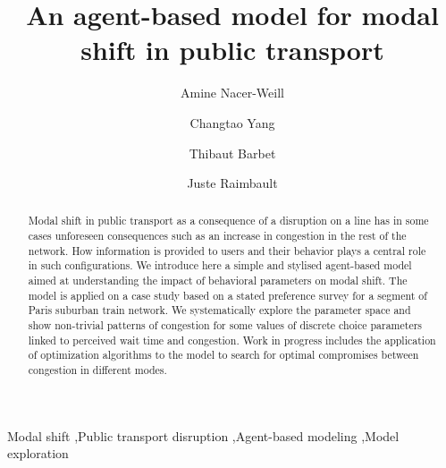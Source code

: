 \documentclass[3p,times,procedia]{elsarticle}
\begin{document}
\begin{frontmatter}


\title{An agent-based model for modal shift in public transport}

\author[a]{Amine Nacer-Weill}
\author[a]{Changtao Yang}
\author[a]{Thibaut Barbet}
\author[b]{Juste Raimbault}

\address[a]{Ecole des Ponts ParisTech, Champs-sur-Marne, France}
\address[b]{CASA, University College London, London, United Kingdom}

\begin{abstract}
Modal shift in public transport as a consequence of a disruption on a line has in some cases unforeseen consequences such as an increase in congestion in the rest of the network. How information is provided to users and their behavior plays a central role in such configurations. We introduce here a simple and stylised agent-based model aimed at understanding the impact of behavioral parameters on modal shift. The model is applied on a case study based on a stated preference survey for a segment of Paris suburban train network. We systematically explore the parameter space and show non-trivial patterns of congestion for some values of discrete choice parameters linked to perceived wait time and congestion. Work in progress includes the application of optimization algorithms to the model to search for optimal compromises between congestion in different modes.
\end{abstract}

\begin{keyword}
Modal shift \sep Public transport disruption \sep Agent-based modeling \sep Model exploration
\end{keyword}
\end{frontmatter}






\end{document}
